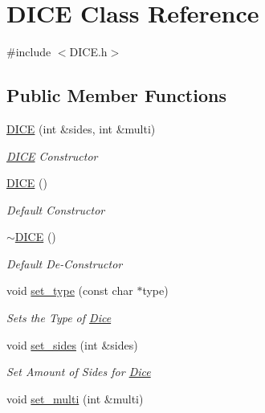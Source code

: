 \hypertarget{class_d_i_c_e}{}\section{D\+I\+CE Class Reference}
\label{class_d_i_c_e}


{\ttfamily \#include $<$D\+I\+C\+E.\+h$>$}

\subsection*{Public Member Functions}
\begin{DoxyCompactItemize}
\item 
\mbox{\hyperlink{class_d_i_c_e_a5b7f251c8cddf1dd2a69bd676d8558fc}{D\+I\+CE}} (int \&sides, int \&multi)
\begin{DoxyCompactList}\small\item\em \mbox{\hyperlink{class_d_i_c_e}{D\+I\+CE}} Constructor \end{DoxyCompactList}\item 
\mbox{\hyperlink{class_d_i_c_e_a28a0c7af0af5491406de1d088b8d76f3}{D\+I\+CE}} ()
\begin{DoxyCompactList}\small\item\em Default Constructor \end{DoxyCompactList}\item 
\mbox{\hyperlink{class_d_i_c_e_ad543253cd88143c29ea51716a09444e5}{$\sim$\+D\+I\+CE}} ()
\begin{DoxyCompactList}\small\item\em Default De-\/\+Constructor \end{DoxyCompactList}\item 
void \mbox{\hyperlink{class_d_i_c_e_a72091c029e5bd18b12451551951e9cdc}{set\+\_\+type}} (const char $\ast$type)
\begin{DoxyCompactList}\small\item\em Sets the Type of \mbox{\hyperlink{namespace_dice}{Dice}} \end{DoxyCompactList}\item 
void \mbox{\hyperlink{class_d_i_c_e_ac7478bfb76a2154fb905147fd27bc7c8}{set\+\_\+sides}} (int \&sides)
\begin{DoxyCompactList}\small\item\em Set Amount of Sides for \mbox{\hyperlink{namespace_dice}{Dice}} \end{DoxyCompactList}\item 
void \mbox{\hyperlink{class_d_i_c_e_a1ad51dd470d2fec9281f4d3b270b1018}{set\+\_\+multi}} (int \&multi)

\end{DoxyCompactItemize}
